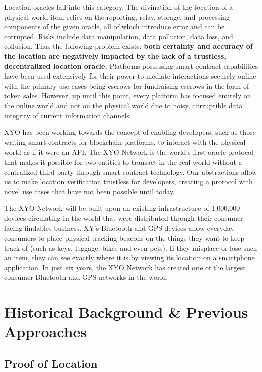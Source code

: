 \documentclass{article}
\begin{document}
Location oracles fall into this category. The divination of the location of a physical world
item relies on the reporting, relay, storage, and processing components of the given oracle,
all of which introduce error and can be corrupted. Risks include data manipulation, data
pollution, data loss, and collusion.
\clearpage
Thus the following problem exists: \textbf{both certainty and accuracy of the location are negatively impacted by the lack of a trustless, decentralized location oracle.} Platforms possessing smart contract capabilities have been used extensively for their power to mediate interactions securely online with the primary use cases being escrows for fundraising escrows in the form of token sales. However, up until this point, every platform has focused entirely on the online world and not on the physical world due to noisy, corruptible data integrity of current information channels.

XYO has been working towards the concept of enabling developers, such as those writing smart contracts for blockchain platforms, to interact with the physical world as if it were an API. The XYO Network is the world's first oracle protocol that makes it possible for two entities to transact in the real world without a centralized third party through smart contract technology. Our abstractions allow us to make location verification trustless for developers, creating a protocol with novel use cases that have not been possible until today.

The XYO Network will be built upon an existing infrastructure of 1,000,000 devices circulating in the world that were distributed through their consumer-facing findables business. XY's Bluetooth and GPS devices allow everyday consumers to place physical tracking beacons on the things they want to keep track of (such as keys, luggage, bikes and even pets). If they misplace or lose such an item, they can see exactly where it is by viewing its location on a smartphone application. In just six years, the XYO Network has created one of the largest consumer Bluetooth and GPS networks in the world.

\section{Historical Background \& Previous Approaches}
\subsection{Proof of Location}
\end{document}
